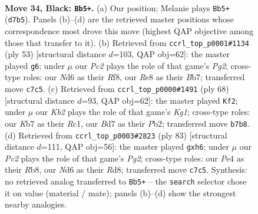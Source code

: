 \documentclass[11pt]{article}
\begin{document}
\clearpage

\begin{figure}[p]\centering
\begin{subfigure}{0.46\textwidth}\centering
\resizebox{\linewidth}{!}{%
\newchessgame
\chessboard[
  setfen={r3r3/1kpb4/pP1n1B2/3N1p2/4p2R/1B6/1P2KPP1/R3N3 b - - 0 34},
  showmover=false,
  pgfstyle=straightmove, color=movearrow, markmove={d7-b5}
]}
\caption{}
\end{subfigure}\hfill
\begin{subfigure}{0.46\textwidth}\centering
\resizebox{\linewidth}{!}{%
\newchessgame
\chessboard[
  setfen={5rk1/1b3pp1/p3n2P/5r2/4p2P/2N3R1/1PP5/2KR1B2 b - - 2 27},
  showmover=false,
  pgfstyle=straightmove, color=movearrow, markmove={g7-g6}
]}
\caption{}
\end{subfigure}
\\[4pt]
\begin{subfigure}{0.46\textwidth}\centering
\resizebox{\linewidth}{!}{%
\newchessgame
\chessboard[
  setfen={3rb1k1/5pb1/p1n4r/Pp1pP2P/5P2/1N3B2/1P4P1/2RR2K1 w - - 9 35},
  showmover=false,
  pgfstyle=straightmove, color=movearrow, markmove={g1-f2}
]}
\caption{}
\end{subfigure}\hfill
\begin{subfigure}{0.46\textwidth}\centering
\resizebox{\linewidth}{!}{%
\newchessgame
\chessboard[
  setfen={1r1rk3/R2n1pp1/2b1p2P/1p2p1P1/1B2P3/8/1PP2NB1/6K1 b - - 0 42},
  showmover=false,
  pgfstyle=straightmove, color=movearrow, markmove={g7-h6}
]}
\caption{}
\end{subfigure}
\caption{\textbf{Move 34, Black: \texttt{Bb5+}.} (a) Our position; Melanie plays \texttt{Bb5+} (\texttt{d7b5}). Panels (b)--(d) are the retrieved master positions whose correspondence most drove this move (highest QAP objective among those that transfer to it). (b) Retrieved from \texttt{ccrl\_top\_p0001\#1134} (ply 53) [structural distance $d$=103, QAP obj=62]: the master played \texttt{g6}; under $\mu$ our \emph{Pc2} plays the role of that game's \emph{Pg2}; cross-type roles: our \emph{N}d6 as their \emph{R}f8, our \emph{R}e8 as their \emph{B}b7; transferred move \texttt{c7c5}. (c) Retrieved from \texttt{ccrl\_top\_p0000\#1491} (ply 68) [structural distance $d$=93, QAP obj=62]: the master played \texttt{Kf2}; under $\mu$ our \emph{Kb2} plays the role of that game's \emph{Kg1}; cross-type roles: our \emph{K}b7 as their \emph{R}c1, our \emph{B}d7 as their \emph{P}b2; transferred move \texttt{b7b8}. (d) Retrieved from \texttt{ccrl\_top\_p0003\#2823} (ply 83) [structural distance $d$=111, QAP obj=56]: the master played \texttt{gxh6}; under $\mu$ our \emph{Pc2} plays the role of that game's \emph{Pg2}; cross-type roles: our \emph{P}e4 as their \emph{R}b8, our \emph{N}d6 as their \emph{R}d8; transferred move \texttt{c7c5}. Synthesis: no retrieved analog transferred to \texttt{Bb5+} -- the \texttt{search} selector chose it on value (material / mate); panels (b)--(d) show the strongest nearby analogies.}
\label{fig:thought-m67}
\end{figure}
\end{document}
